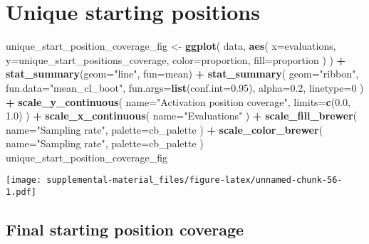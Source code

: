\documentclass[]{book}
\newenvironment{Shaded}{\begin{snugshade}}{\end{snugshade}}
\newcommand{\DataTypeTok}[1]{\textcolor[rgb]{0.13,0.29,0.53}{#1}}
\newcommand{\DecValTok}[1]{\textcolor[rgb]{0.00,0.00,0.81}{#1}}
\newcommand{\FloatTok}[1]{\textcolor[rgb]{0.00,0.00,0.81}{#1}}
\newcommand{\KeywordTok}[1]{\textcolor[rgb]{0.13,0.29,0.53}{\textbf{#1}}}
\newcommand{\NormalTok}[1]{#1}
\newcommand{\OperatorTok}[1]{\textcolor[rgb]{0.81,0.36,0.00}{\textbf{#1}}}
\newcommand{\StringTok}[1]{\textcolor[rgb]{0.31,0.60,0.02}{#1}}
\begin{document}
\hypertarget{unique-starting-positions-4}{%
\section{Unique starting positions}\label{unique-starting-positions-4}}

\begin{Shaded}
\begin{Highlighting}[]
\NormalTok{unique_start_position_coverage_fig <-}\StringTok{ }\KeywordTok{ggplot}\NormalTok{(}
\NormalTok{    data,}
    \KeywordTok{aes}\NormalTok{(}
      \DataTypeTok{x=}\NormalTok{evaluations,}
      \DataTypeTok{y=}\NormalTok{unique_start_positions_coverage,}
      \DataTypeTok{color=}\NormalTok{proportion,}
      \DataTypeTok{fill=}\NormalTok{proportion}
\NormalTok{    )}
\NormalTok{  ) }\OperatorTok{+}
\StringTok{  }\KeywordTok{stat_summary}\NormalTok{(}\DataTypeTok{geom=}\StringTok{"line"}\NormalTok{, }\DataTypeTok{fun=}\NormalTok{mean) }\OperatorTok{+}
\StringTok{  }\KeywordTok{stat_summary}\NormalTok{(}
    \DataTypeTok{geom=}\StringTok{"ribbon"}\NormalTok{,}
    \DataTypeTok{fun.data=}\StringTok{"mean_cl_boot"}\NormalTok{,}
    \DataTypeTok{fun.args=}\KeywordTok{list}\NormalTok{(}\DataTypeTok{conf.int=}\FloatTok{0.95}\NormalTok{),}
    \DataTypeTok{alpha=}\FloatTok{0.2}\NormalTok{,}
    \DataTypeTok{linetype=}\DecValTok{0}
\NormalTok{  ) }\OperatorTok{+}
\StringTok{  }\KeywordTok{scale_y_continuous}\NormalTok{(}
    \DataTypeTok{name=}\StringTok{"Activation position coverage"}\NormalTok{,}
    \DataTypeTok{limits=}\KeywordTok{c}\NormalTok{(}\FloatTok{0.0}\NormalTok{, }\FloatTok{1.0}\NormalTok{)}
\NormalTok{  ) }\OperatorTok{+}
\StringTok{  }\KeywordTok{scale_x_continuous}\NormalTok{(}
    \DataTypeTok{name=}\StringTok{"Evaluations"}
\NormalTok{  ) }\OperatorTok{+}
\StringTok{  }\KeywordTok{scale_fill_brewer}\NormalTok{(}
    \DataTypeTok{name=}\StringTok{"Sampling rate"}\NormalTok{,}
    \DataTypeTok{palette=}\NormalTok{cb_palette}
\NormalTok{  ) }\OperatorTok{+}
\StringTok{  }\KeywordTok{scale_color_brewer}\NormalTok{(}
    \DataTypeTok{name=}\StringTok{"Sampling rate"}\NormalTok{,}
    \DataTypeTok{palette=}\NormalTok{cb_palette}
\NormalTok{  )}
\NormalTok{unique_start_position_coverage_fig}
\end{Highlighting}
\end{Shaded}

\texttt{[image: supplemental-material\_files/figure-latex/unnamed-chunk-56-1.pdf]}

\hypertarget{final-starting-position-coverage-3}{%
\subsection{Final starting position coverage}\label{final-starting-position-coverage-3}}
\end{document}
